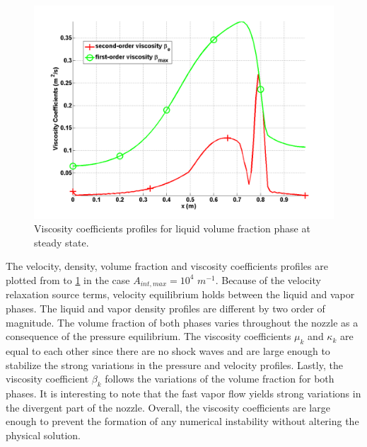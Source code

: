 \begin{figure}[H]
\centering
\includegraphics[width=\textwidth]{figures/SEM/Aint1e4_liquid_beta.png}
\caption{Viscosity coefficients profiles for liquid volume fraction phase at steady state.}
\label{fig:two-fluids-rel-nozzle-visc-vf-sem-sect4}
\end{figure}
%
The velocity, density, volume fraction and viscosity coefficients profiles are plotted from  to \ref{fig:two-fluids-rel-nozzle-visc-vf-sem-sect4} in the case $A_{int,max} = 10^4$ $m^{-1}$. Because of the velocity relaxation source terms, velocity equilibrium holds between the liquid and vapor phases. The liquid and vapor density profiles are different by two order of magnitude. The volume fraction of both phases varies throughout the nozzle as a consequence of the pressure equilibrium. The viscosity coefficients $\mu_k$ and $\kappa_k$ are equal to each other since there are no shock waves and are large enough to stabilize the strong variations in the pressure and velocity profiles. Lastly, the viscosity coefficient $\beta_k$ follows the variations of the volume fraction for both phases. It is interesting to note that the fast vapor flow yields strong variations in the divergent part of the nozzle. Overall, the viscosity coefficients are large enough to prevent the formation of any numerical instability without altering the physical solution.\\
%

